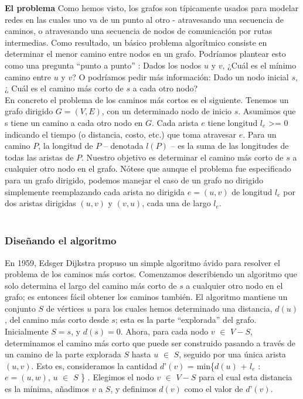 \documentclass[a4paper]{article}
\begin{document}
\textbf{El problema}
Como hemos visto, los grafos son típicamente usados para modelar redes en las cuales uno va de un punto al otro -  atravesando una secuencia de caminos, o atravesando una secuencia de nodos de comunicación por rutas intermedias. Como resultado, un básico problema algorítmico consiste en determinar el menor camino entre nodos en un grafo. Podríamos plantear esto como una pregunta “punto a punto” : Dados los nodos $u$ y $v$, ¿Cuál es el mínimo camino entre $u$ y $v$? O podríamos pedir más información: Dado un nodo inicial $s$, ¿ Cuál es el camino más corto de $s$ a cada otro nodo?\\

En concreto el problema de los caminos más cortos es el siguiente. Tenemos un grafo dirigido $G=(V,E)$, con un determinado nodo de inicio $s$. Asumimos que s tiene un camino a cada otro nodo en $G$. Cada arista $e$ tiene longitud $l_e$ >=  0 indicando el tiempo (o distancia, costo, etc.) que toma atravesar $e$. Para un camino $P$, la longitud de $P$ – denotada $l(P)$ – es la suma de las longitudes de todas las aristas de $P$. Nuestro objetivo es determinar el camino más corto de $s$ a cualquier otro nodo en el grafo. Nótese que aunque el problema fue especificado para un grafo dirigido, podemos manejar el caso de un grafo no dirigido simplemente reemplazando cada arista no dirigida $e=(u,v)$ de longitud $l_e$ por dos aristas dirigidas $(u,v)$ y $(v,u)$, cada una de largo $l_e$.\\\\

\subsubsection*{Diseñando el algoritmo}
En 1959, Edsger Dijkstra propuso un simple algoritmo ávido para resolver el problema de los caminos más cortos. Comenzamos describiendo un algoritmo que solo determina el largo del camino más corto de $s$ a cualquier otro nodo en el grafo; es entonces fácil obtener los caminos también. El algoritmo mantiene un conjunto $S$ de vértices $u$ para los cuales hemos determinado una distancia, $d(u)$, del camino más corto desde $s$; esta es la parte “explorada” del grafo. Inicialmente $S={s}$, y $d(s)=0$. Ahora, para cada nodo $v$ \(\in\) $V-S$, determinamos el camino más corto que puede ser construido pasando a través de un camino de la parte explorada $S$ hasta $u$ \(\in\) $S$, seguido por una única arista $(u,v)$. Esto es, consideramos la cantidad $d’(v)$ = min\{$d (u)$ + $l_e$ : $e=(u,w)$, $u$ \(\in\) $S$ \} . Elegimos el nodo $v$ \(\in\) $V-S$ para el cual esta distancia es la mínima, añadimos $v$ a $S$, y definimos $d(v)$ como el valor de $d’(v)$.\\
\end{document}
